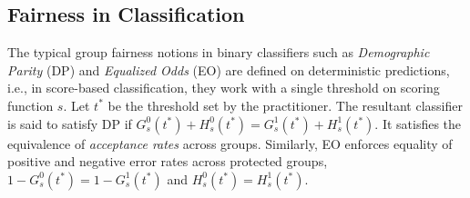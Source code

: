 \documentclass{article}
\begin{document}
\subsection{Fairness in Classification}

The typical group fairness notions in binary classifiers such as \emph{Demographic Parity }(DP) and \emph{Equalized Odds} (EO) are defined on deterministic predictions, i.e., in score-based classification, they work with a single threshold on scoring function $s$. Let $t^*$ be the threshold set by the practitioner. The resultant classifier is said to satisfy DP if
$
    G_s^0(t^*) + H_s^0(t^*) = G_s^1(t^*) + H_s^1(t^*)
$.
It satisfies the equivalence of \emph{acceptance rates} across groups.
Similarly, EO enforces equality of positive and negative error rates across protected groups, $1 - G_s^0(t^*) = 1 - G_s^1(t^*)$ and $H_s^0(t^*) = H_s^1(t^*)$.

\end{document}
